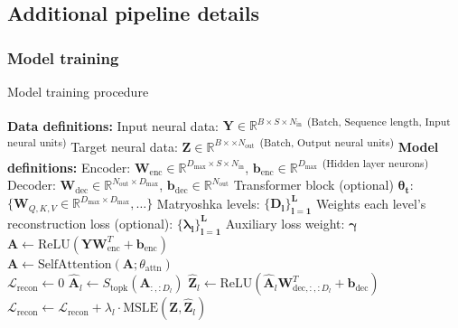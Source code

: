\subsection{Additional pipeline details}
\label{subsection:additional_pipeline_details}

\subsubsection{Model training}
\label{subsubsection:model_training_details}

\begin{algorithm}[bh]
\caption{Model training procedure}
\label{algorithm:sded_model_training}
\begin{algorithmic}[1]
\State \textbf{Data definitions:}
\State \quad Input neural data: $\mathbf{Y} \in \mathbb{R}^{B \times S \times N_{\text{in}}}$ \textsuperscript{(Batch, Sequence length, Input neural units)}
\State \quad Target neural data: $\mathbf{Z} \in \mathbb{R}^{B \times \times N_{\text{out}}}$ \textsuperscript{(Batch, Output neural units)}
\State \textbf{Model definitions:}
\State \quad Encoder: $\mathbf{W}_{\text{enc}} \in \mathbb{R}^{D_{\text{max}} \times S \times N_{\text{in}}}$, $\mathbf{b}_{\text{enc}} \in \mathbb{R}^{D_{\text{max}}}$ \textsuperscript{(Hidden layer neurons)}
\State \quad Decoder: $\mathbf{W}_{\text{dec}} \in \mathbb{R}^{N_{\text{out}} \times D_{\text{max}}}$, $\mathbf{b}_{\text{dec}} \in \mathbb{R}^{N_{\text{out}}}$
\State \quad Transformer block (optional) $\mathbf{\theta_{t}}$: $\{\mathbf{W}_{Q,K,V} \in \mathbb{R}^{D_{\max} \times D_{\max}}, \dots\}$
\State \quad Matryoshka levels: $\mathbf{\{D_l\}_{l=1}^L}$
\State \quad Weights each level's reconstruction loss (optional): $\mathbf{\{\lambda_l\}_{l=1}^L}$
\State \quad Auxiliary loss weight: $\mathbf{\gamma}$
\\
    \Statex {}
    \State $\mathbf{A} \gets \text{ReLU}(\mathbf{Y}\mathbf{W}_{\text{enc}}^T + \mathbf{b}_{\text{enc}})$ 
    \\
        \State $\mathbf{A} \gets \text{SelfAttention}(\mathbf{A}; \theta_{\text{attn}})$ 
    \EndIf
    \\
    \State $\mathcal{L}_{\text{recon}} \gets 0$
     
        \State $\hat{\mathbf{A}}_l \gets S_{\text{topk}}(\mathbf{A}_{:, :D_l})$ 
        \State $\hat{\mathbf{Z}}_l \gets \text{ReLU}(\hat{\mathbf{A}}_l \mathbf{W}_{\text{dec}, :, :D_l}^T + \mathbf{b}_{\text{dec}})$ 
        \State $\mathcal{L}_{\text{recon}} \gets \mathcal{L}_{\text{recon}} + \lambda_l \cdot \text{MSLE}(\mathbf{Z}, \hat{\mathbf{Z}}_l)$ 
    \EndFor
    

\end{algorithmic}
\end{algorithm}
